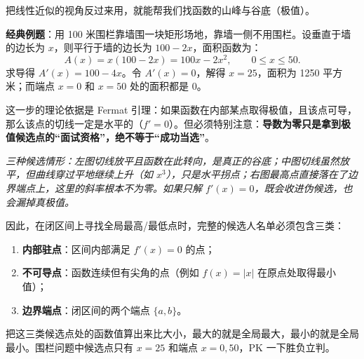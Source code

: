 把线性近似的视角反过来用，就能帮我们找函数的山峰与谷底（极值）。

\textbf{经典例题}：用 100 米围栏靠墙围一块矩形场地，靠墙一侧不用围栏。设垂直于墙的边长为 \(x\)，则平行于墙的边长为 \(100-2x\)，面积函数为：
\[
A(x) = x(100-2x) = 100x - 2x^2, \qquad 0 \le x \le 50.
\]
求导得 \(A'(x) = 100 - 4x\)。令 \(A'(x) = 0\)，解得 \(x = 25\)，面积为 1250 平方米；而端点 \(x=0\) 和 \(x=50\) 处的面积都是 0。

这一步的理论依据是 Fermat 引理：如果函数在内部某点取得极值，且该点可导，那么该点的切线一定是水平的（\(f'=0\)）。但必须特别注意：\textbf{导数为零只是拿到极值候选点的``面试资格''，绝不等于``成功当选''}。

\begin{center}

\emph{三种候选情形：左图切线放平且函数在此转向，是真正的谷底；中图切线虽然放平，但曲线穿过平地继续上升（如 \(x^3\)），只是水平拐点；右图最高点直接落在了边界端点上，这里的斜率根本不为零。如果只解 \(f'(x)=0\)，既会收进伪候选，也会漏掉真极值。}
\end{center}

因此，在闭区间上寻找全局最高/最低点时，完整的候选人名单必须包含三类：
\begin{enumerate}
    \item \textbf{内部驻点}：区间内部满足 \(f'(x) = 0\) 的点；
    \item \textbf{不可导点}：函数连续但有尖角的点（例如 \(f(x)=|x|\) 在原点处取得最小值）；
    \item \textbf{边界端点}：闭区间的两个端点 \(\{a, b\}\)。
\end{enumerate}
把这三类候选点处的函数值算出来比大小，最大的就是全局最大，最小的就是全局最小。围栏问题中候选点只有 \(x=25\) 和端点 \(x=0, 50\)，PK 一下胜负立判。

